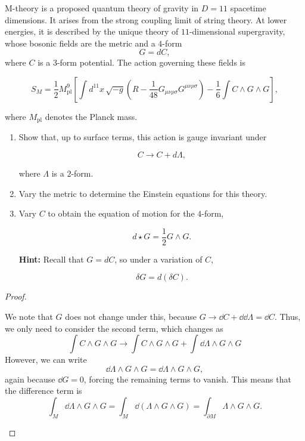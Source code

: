\begin{Problem}[M-Theory]

M-theory is a proposed quantum theory of gravity in $D=11$ spacetime dimensions. It arises from the strong coupling limit of string theory. At lower energies, it is described by the unique theory of $11$-dimensional supergravity, whose bosonic fields are the metric and a $4$-form
\[
G=dC,
\]
where $C$ is a $3$-form potential. The action governing these fields is

\[
S_{M}
=
\frac12 M_{\mathrm{pl}}^9
\left[
\int d^{11}x\,\sqrt{-g}
\left(
R
-\frac1{48}
G_{\mu\nu\rho\sigma}
G^{\mu\nu\rho\sigma}
\right)
-
\frac16
\int
C\wedge G\wedge G
\right],
\]

where $M_{\mathrm{pl}}$ denotes the Planck mass.

\begin{enumerate}

\item[(a)]
Show that, up to surface terms, this action is gauge invariant under

\[
C \longrightarrow C+d\Lambda,
\]

where $\Lambda$ is a $2$-form.

\item[(b)]
Vary the metric to determine the Einstein equations for this theory.

\item[(c)]
Vary $C$ to obtain the equation of motion for the $4$-form,

\[
d\star G
=
\frac12
G\wedge G.
\]

\textbf{Hint:} Recall that $G=dC$, so under a variation of $C$,

\[
\delta G=d(\delta C).
\]

\end{enumerate}

\end{Problem}
\begin{proof}
	\begin{parts}
	\item We note that $G$ does not change under this, because $G\to \dd{C} + \dd{\dd{\Lambda}}=\dd{C}$. Thus, we only need to consider the second term, which changes as
		\[
			\int C\wedge G\wedge G \to \int C \wedge G \wedge G+\int \dd{\Lambda}\wedge G \wedge G
		\] 
		However, we can write
		\[
			\dd{\Lambda\wedge G \wedge G} = \dd{\Lambda}\wedge G \wedge G
		,\]
		again because $\dd{G}=0$, forcing the remaining terms to vanish. This means that the difference term is
		\[
			\int_M \dd{\Lambda}\wedge G\wedge G = \int_M \dd{(\Lambda\wedge G \wedge G)} = \int_{\partial M}\Lambda \wedge G \wedge G
		.\] 
	\end{parts}
\end{proof}
